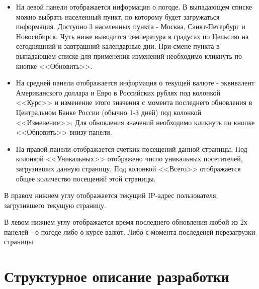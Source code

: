 \documentclass{article}
\begin{document}
\begin{itemize}
\item На левой панели отображается информация о погоде. В выпадающем списке можно выбрать населенный пункт,
по которому будет загружаться информация. Доступно 3 населенных пункта - Москва, Санкт-Петербург и Новосибирск.
Чуть ниже выводится температура в градусах по Цельсию на сегодняшний и завтрашний календарные дни. При смене пункта в выпадающем списке для применения изменений необходимо кликнуть по кнопке <<Обновить>>.
\item На средней панели отображается информация о текущей валюте - эквивалент Американского доллара и Евро в Российских рублях под колонкой <<Курс>> и изменение этого значения с момента последнего обновления в Центральном Банке России (обычно 1-3 дней) под  колонкой <<Изменение>>. Для обновления значений необходимо кликнуть по кнопке <<Обновить>> внизу панели.
\item На правой панели отображается счеткик посещений данной страницы. Под колонкой <<Уникальных>> отображено число уникальных посетителей, загрузивших данную страницу. Под колонкой <<Всего>> отображается общее количество посещений этой страницы.
\end{itemize}

В правом нижнем углу отображается текущий IP-адрес пользователя, загрузившего текущую страницу.

В левом нижнем углу отображается время последнего обновления любой из 2х панелей - о погоде либо о курсе валют. Либо с момента последеней перезагрузки страницы.

\section{Структурное описание разработки}
\end{document}
